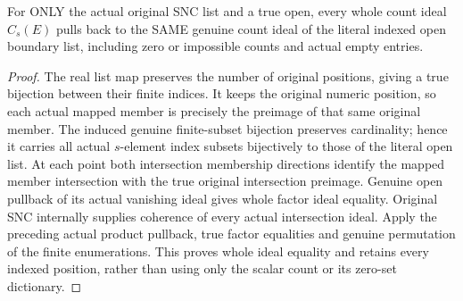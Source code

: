 \begin{theorem}
\label{hir:original-indexed-snc-count-entire-open-pullback}
\leanok
{}
For ONLY the actual original SNC list and a true open, every whole count ideal
$C_s(E)$ pulls back to the SAME genuine count ideal of the literal indexed
open boundary list, including zero or impossible counts and actual empty entries.
\end{theorem}
\begin{proof}
The real list map preserves the number of original positions, giving a true
bijection between their finite indices. It keeps the original numeric position,
so each actual mapped member is precisely the preimage of that same original
member. The induced genuine finite-subset bijection preserves cardinality;
hence it carries all actual $s$-element index subsets bijectively to those of
the literal open list. At each point both intersection membership directions
identify the mapped member intersection with the true original intersection
preimage. Genuine open pullback of its actual vanishing ideal gives whole
factor ideal equality. Original SNC internally supplies coherence of every
actual intersection ideal. Apply the preceding actual product pullback, true
factor equalities and genuine permutation of the finite enumerations. This
proves whole ideal equality and retains every indexed position, rather than
using only the scalar count or its zero-set dictionary.
\end{proof}

